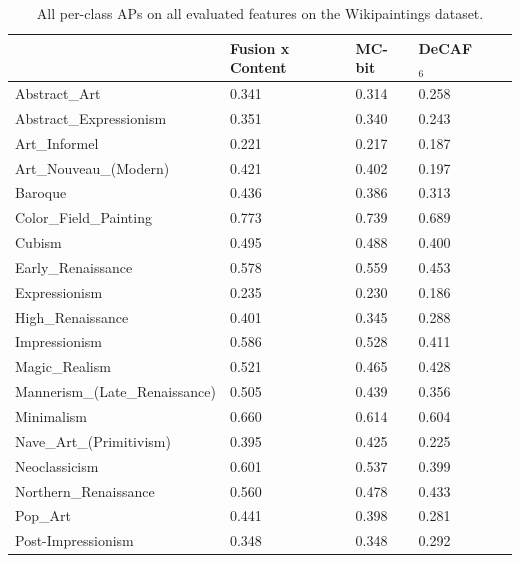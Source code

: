\begin{table}[ht!]
\centering
\caption{
    All per-class APs on all evaluated features on the Wikipaintings dataset.
}\label{tab:wikipaintings_ap_table}
\vspace{1em}

\begin{tabular}{llllll}
\toprule
{}                             & Fusion x Content & MC-bit & DeCAF$_6$  \\
\midrule
Abstract\_Art                  & 0.341            & 0.314  & 0.258      \\
Abstract\_Expressionism        & 0.351            & 0.340  & 0.243      \\
Art\_Informel                  & 0.221            & 0.217  & 0.187      \\
Art\_Nouveau\_(Modern)         & 0.421            & 0.402  & 0.197      \\
Baroque                        & 0.436            & 0.386  & 0.313      \\
Color\_Field\_Painting         & 0.773            & 0.739  & 0.689      \\
Cubism                         & 0.495            & 0.488  & 0.400      \\
Early\_Renaissance             & 0.578            & 0.559  & 0.453      \\
Expressionism                  & 0.235            & 0.230  & 0.186      \\
High\_Renaissance              & 0.401            & 0.345  & 0.288      \\
Impressionism                  & 0.586            & 0.528  & 0.411      \\
Magic\_Realism                 & 0.521            & 0.465  & 0.428      \\
Mannerism\_(Late\_Renaissance) & 0.505            & 0.439  & 0.356      \\
Minimalism                     & 0.660            & 0.614  & 0.604      \\
Nave\_Art\_(Primitivism)       & 0.395            & 0.425  & 0.225      \\
Neoclassicism                  & 0.601            & 0.537  & 0.399      \\
Northern\_Renaissance          & 0.560            & 0.478  & 0.433      \\
Pop\_Art                       & 0.441            & 0.398  & 0.281      \\
Post-Impressionism             & 0.348            & 0.348  & 0.292      \\

\end{tabular}
\end{table}
